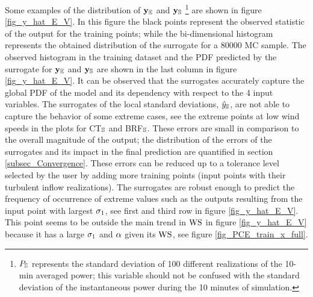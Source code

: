 \documentclass[preprint,12pt]{elsarticle}
\begin{document}
Some examples of the distribution of  $\mathbf{y}_{\mathbb{E}}$ and $\mathbf{y}_{\mathbb{S}}$ \footnote{$P_{\mathbb{S}}$ represents the standard deviation of 100 different realizations of the 10-min averaged power; this variable should not be confused with the standard deviation of the instantaneous power during the 10 minutes of simulation.} are shown in figure \ref{fig_y_hat_E_V}. In this figure the black points represent the observed statistic of the output for the training points; while the bi-dimensional histogram represents the obtained distribution of the surrogate for a 80000 MC sample. The observed histogram in the training dataset and the PDF predicted by the surrogate for $\mathbf{y}_{\mathbb{E}}$ and $\mathbf{y}_{\mathbb{S}}$ are shown in the last column in figure \ref{fig_y_hat_E_V}. It can be observed that the surrogates accurately capture the global PDF of the model and its dependency with respect to the 4 input variables. The surrogates of the local standard deviations, $\hat{y}_{\mathbb{S}}$, are not able to capture the behavior of some extreme cases, see the extreme points at low wind speeds in the plots for CT$_{\mathbb{S}}$ and BRF$_{\mathbb{S}}$. These errors are small in comparison to the overall magnitude of the output; the distribution of the errors of the surrogates and its impact in the final prediction are quantified in section \ref{subsec_Convergence}. These errors can be reduced up to a tolerance level selected by the user by adding more training points (input points with their turbulent inflow realizations). The surrogates are robust enough to predict the frequency of occurrence of extreme values such as the outputs resulting from the input point with largest $\sigma_{1}$, see first and third row in figure \ref{fig_y_hat_E_V}. This point seems to be outside the main trend in $\text{WS}$ in figure \ref{fig_y_hat_E_V} because it has a large $\sigma_{1}$ and $\alpha$ given its $\text{WS}$, see figure \ref{fig_PCE_train_x_full}.
\end{document}
